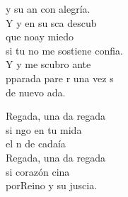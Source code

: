 \begin{cancion}[Regalada][Ixcís]
	y su an con alegría. \\
	\jump
	Y y en su sca descub\\
	que noay miedo\\
	si tu no me sostiene confia.\\
	Y y me scubro ante\\
	pparada pare r una vez s \\
	de nuevo ada.\jump\\
	\begin{chorus}%
		Regada, una da regada\\
		si ngo en tu mida \\
		el n de cadaía\\
		Regada, una da regada\\
		si  corazón cina \\
		porReino y su juscia.\jump\\
	\end{chorus}%
\end{cancion}%
